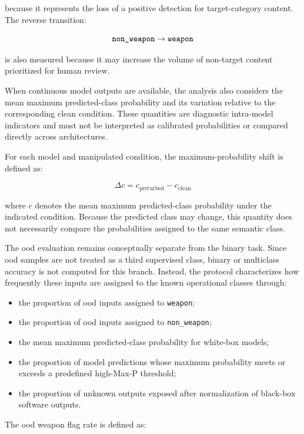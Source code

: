 because it represents the loss of a positive detection for target-category
content. The reverse transition:

\[
\text{\texttt{non\_weapon}}
\rightarrow
\text{\texttt{weapon}}
\]

is also measured because it may increase the volume of non-target content
prioritized for human review.

When continuous model outputs are available, the analysis also considers
the mean maximum predicted-class probability and its variation relative to the
corresponding clean condition. These quantities are diagnostic intra-model
indicators and must not be interpreted as calibrated probabilities or compared
directly across architectures.

For each model and manipulated condition, the maximum-probability shift
is defined as:

\begin{equation}
\Delta c
=
c_{\mathrm{perturbed}}
-
c_{\mathrm{clean}}
\end{equation}

where \(c\) denotes the mean maximum predicted-class probability under the
indicated condition. Because the predicted class may change, this quantity does
not necessarily compare the probabilities assigned to the same semantic class.

The \gls{ood} evaluation remains conceptually separate from the binary task.
Since \gls{ood} samples are not treated as a third supervised class, binary or
multiclass accuracy is not computed for this branch. Instead, the protocol
characterizes how frequently these inputs are assigned to the known
operational classes through:

\begin{itemize}
\item the proportion of \gls{ood} inputs assigned to \texttt{weapon};
\item the proportion of \gls{ood} inputs assigned to
\texttt{non\_weapon};
\item the mean maximum predicted-class probability for white-box models;
\item the proportion of model predictions whose maximum probability
meets or exceeds a predefined high-Max-P threshold;
\item the proportion of unknown outputs exposed after normalization of
black-box software outputs.
\end{itemize}

The \gls{ood} weapon flag rate is defined as:

